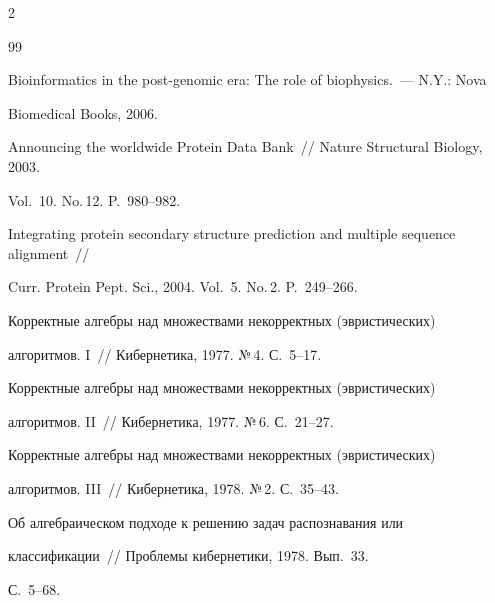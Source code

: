 \begin{multicols}{2}
{{\begin{thebibliography}{99}


Bioinformatics in the post-genomic era: The role of biophysics.~--- N.Y.: Nova 

Biomedical Books, 2006. %





Announcing the worldwide Protein Data Bank~// Nature Structural Biology, 2003. 

Vol.~10. No.\,12. P.~980--982.





Integrating protein secondary structure prediction and multiple sequence alignment~// 

Curr. Protein Pept. Sci., 2004. Vol.~5. No.\,2. P.~249--266.





Корректные алгебры над множествами некорректных (эвристических) 

алгоритмов. I~// Кибернетика, 1977. №\,4. С.~5--17.





Корректные алгебры над множествами некорректных (эвристических) 

алгоритмов. II~// Кибернетика, 1977. №\,6. С.~21--27.





Корректные алгебры над множествами некорректных (эвристических) 

алгоритмов. III~// Кибернетика, 1978. №\,2. С.~35--43.





Об алгебраическом подходе к решению задач распознавания или 

классификации~// Проблемы кибернетики, 1978. Вып.~33. 

С.~5--68.




\end{thebibliography}}}
\end{multicols}
